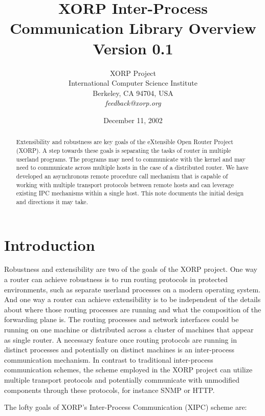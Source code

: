 \documentclass[11pt]{article}
\title{XORP Inter-Process Communication Library Overview \\
\vspace{1ex}
Version 0.1}
\author{ XORP Project					\\
	 International Computer Science Institute	\\
	 Berkeley, CA 94704, USA			\\
	 {\it feedback@xorp.org}
}
\date{December 11, 2002}
\begin{document}
\maketitle
\begin{abstract}Extensibility and robustness are key goals of the eXtensible
Open Router Project (XORP).  A step towards these goals is separating
the tasks of router in multiple userland programs.  The programs may
need to communicate with the kernel and may need to communicate across
multiple hosts in the case of a distributed router.  We have developed
an asynchronous remote procedure call mechanism that is capable of
working with multiple transport protocols between remote hosts and can
leverage existing IPC mechanisms within a single host. This note
documents the initial design and directions it may take.
\end{abstract}

\section{Introduction}

Robustness and extensibility are two of the goals of the XORP project.
One way a router can achieve robustness is to run routing protocols in
protected environments, such as separate userland processes on a
modern operating system.  And one way a router can achieve
extensibility is to be independent of the details about where those
routing processes are running and what the composition of the
forwarding plane is.  The routing processes and network interfaces
could be running on one machine or distributed across a cluster of
machines that appear as single router.  A necessary feature once
routing protocols are running in distinct processes and potentially on
distinct machines is an inter-process communication mechanism.  In
contrast to traditional inter-process communication schemes, the
scheme employed in the XORP project can utilize multiple transport
protocols and potentially communicate with unmodified components
through these protocols, for instance SNMP or HTTP.

The lofty goals of XORP's Inter-Process Communication (XIPC) scheme are:
\end{document}

